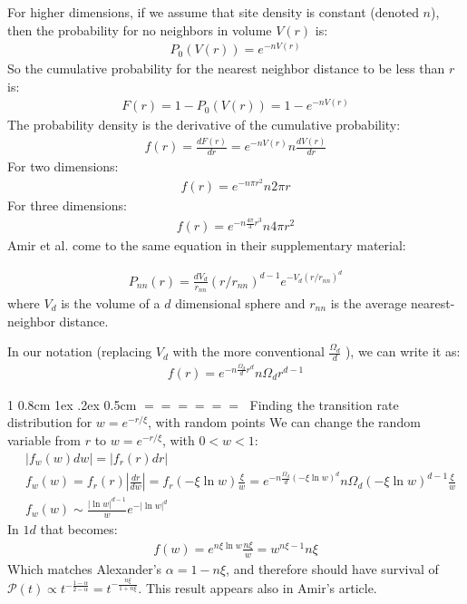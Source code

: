 \documentclass[onecolumn,fleqn,notitlepage,secnumarabic]{revtex4}
\makeatletter
\newenvironment{fminipage}%
  {\begin{Sbox}\begin{minipage}}%
  {\end{minipage}\end{Sbox}\fbox{\TheSbox}}
\def\section{%
  \@startsection
    {section}%
    {1}%
    {\z@}%
    {0.8cm \@plus1ex \@minus .2ex}%
    {0.5cm}%
    {\Large\bf $=\!=\!=\!=\!=\!=\;$}%
}%
\makeatother
\begin{document}
For higher dimensions, if we assume that site density is constant (denoted $n$), then the probability for no neighbors in volume $V(r)$ is:
\begin{align} P_0( V(r)) = e^{-nV(r)}\end{align}
So the cumulative probability for the nearest neighbor distance to be less than $r$ is:
\begin{align} F (r) = 1-P_0(V(r)) = 1- e^{-nV(r)} \end{align}
The probability density is the derivative of the cumulative probability:
\begin{align} f(r) = \frac{dF(r)}{dr} =   e^{-nV(r)} n \frac{dV(r)}{dr} \end{align}
For two dimensions:
\begin{align} f(r) = e^{-n \pi r^2}n2\pi r \end{align}
For three dimensions:
\begin{align} f(r) = e^{-n \frac{4\pi}{3} r^3}n4\pi r^2 \end{align}
Amir et al. \cite{Amir:2010:PRL} come to the same equation in their supplementary material:

\begin{fminipage}{\textwidth}
\begin{align}P_{nn}(r)=\frac{d
V_d}{r_{nn}} {(r/r_{nn})}^{d-1} e^{-V_d {(r/r_{nn})}^d}\end{align} 
where $V_d$ is the volume of a $d$ dimensional sphere and $r_{nn}$ is the
average nearest-neighbor distance.
\end{fminipage}

In our notation (replacing $V_d$ with the more conventional $\frac{\Omega_d}{d}$ ), we can write it as:
\begin{align} f(r) = e^{-n \frac{\Omega_d}{d} r^d} n\Omega_d r^{d-1} \end{align}

\section{Finding the transition rate distribution for $w= e^{-r/ \xi}$, with random points}
We can change the random variable from $r$ to $w= e^{-r/ \xi}$, with $0<w<1$:
\begin{align}
    &|f_w(w)dw| = |f_r(r)dr| \\
    &f_w(w) = f_r(r)\left|\frac{dr}{dw}\right| = f_r(-\xi \ln w)\frac{\xi}{w} = e^{-n \frac{\Omega_d}{d} (-\xi\ln w)^d} n\Omega_d (-\xi\ln w)^{d-1}\frac{\xi}{w} \\
    &f_w(w) \sim \frac{|\ln w|^{d-1}}{w} e^{-|\ln w|^d}
\end{align}
In $1d$ that becomes:
\begin{align} f(w)= e^{n \xi\ln w} \frac{n\xi}{w} = w^{n\xi-1}n\xi\end{align}
Which matches Alexander's $\alpha = 1-n\xi$, and therefore should have survival of $\mathcal{P}(t)\propto t^{-\frac{1-\alpha}{2-\alpha}}= t^{-\frac{n\xi}{1+n\xi}}$. This result appears also in Amir's article.
\end{document}
